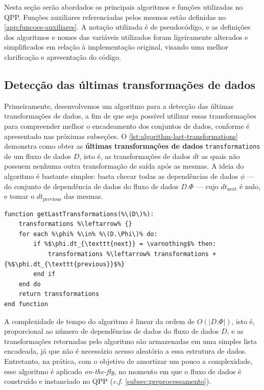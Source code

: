 Nesta seção serão abordados os principais algoritmos e funções utilizadas no QPP. Funções auxiliares referenciadas pelos mesmos estão definidas no \autoref{app:funcoes-auxiliares}. A notação utilizada é de pseudocódigo, e as definições dos algoritmos e nomes das variáveis utilizados foram ligeiramente alterados e simplificados em relação à implementação original, visando uma melhor clarificação e apresentação do código.

\subsection{Detecção das últimas transformações de dados}

Primeiramente, desenvolvemos um algoritmo para a detecção das últimas transformações de dados, a fim de que seja possível utilizar essas transformações para compreender melhor o encadeamento dos conjuntos de dados, conforme é apresentado nas próximas subseções. O \autoref{lst:algorithm-last-transformations} demonstra como obter as \textbf{últimas transformações de dados} \texttt{transformations} de um fluxo de dados \( D \), isto é, as transformações de dados \(dt\) as quais não possuem nenhuma outra transformação de saída após as mesmas. A ideia do algoritmo é bastante simples: basta checar todas as dependências de dados \( \phi \) --- do conjunto de dependência de dados do fluxo de dados \( D.\Phi \) --- cujo \( dt_{\textrm{next}} \) é nulo, e tomar o \( dt_{\textrm{previous}} \) das mesmas.

\begin{minipage}[c]{0.95\textwidth}
\begin{lstlisting}[language=pseudocode,label={lst:algorithm-last-transformations},caption={[Detecção das últimas transformações de dados]Detecção das útimas transformações de dados em uma especificação de fluxo de dados.}]
function getLastTransformations(%\(D\)%):
    transformations %\leftarrow% {}
    for each %\phi% %\in% %\(D.\Phi\)% do:
        if %$\phi.dt_{\texttt{next}} = \varnothing$% then:
            transformations %\leftarrow% transformations + {%$\phi.dt_{\texttt{previous}}$%}
        end if
    end do
    return transformations
end function
\end{lstlisting}
\end{minipage}

A complexidade de tempo do algoritmo é linear da ordem de \( O(|D.\Phi|) \), isto é, proporcional ao número de dependências de dados do fluxo de dados \( D \), e as transformações retornadas pelo algoritmo são armazenadas em uma simples lista encadeada, já que não é necessário acesso aleatório a essa estrutura de dados. Entretanto, na prática, com o objetivo de amortizar um pouco a complexidade, esse algoritmo é aplicado \textit{on-the-fly}, no momento em que o fluxo de dados é construído e instanciado no QPP (\textit{c.f.} \autoref{subsec:preprocessamento}).

